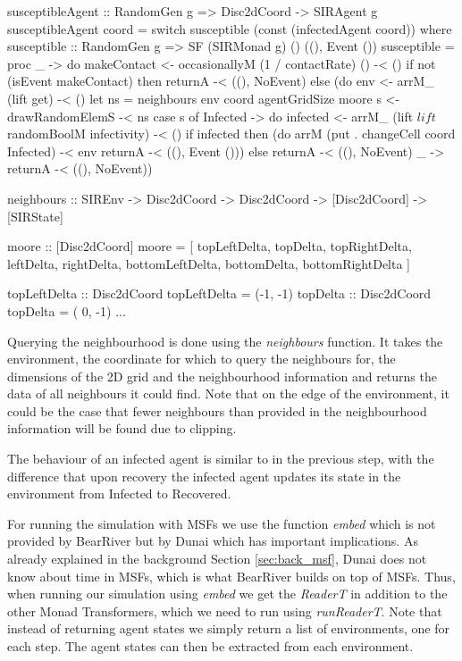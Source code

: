 \begin{HaskellCode}
susceptibleAgent :: RandomGen g => Disc2dCoord -> SIRAgent g
susceptibleAgent coord
    = switch susceptible (const (infectedAgent coord))
  where
    susceptible :: RandomGen g 
      => SF (SIRMonad g) () ((), Event ())
    susceptible = proc _ -> do
      makeContact <- occasionallyM (1 / contactRate) () -< ()
      if not (isEvent makeContact)
        then returnA -< ((), NoEvent)
        else (do
          env <- arrM_ (lift get) -< ()
          let ns = neighbours env coord agentGridSize moore
          s <- drawRandomElemS -< ns
          case s of
            Infected -> do
              infected <- arrM_ 
                (lift $ lift $ randomBoolM infectivity) -< ()
              if infected 
                then (do
                  arrM (put . changeCell coord Infected) -< env
                  returnA -< ((), Event ()))
                else returnA -< ((), NoEvent)
            _        -> returnA -< ((), NoEvent))

neighbours :: SIREnv -> Disc2dCoord -> Disc2dCoord 
           -> [Disc2dCoord] -> [SIRState]
           
moore :: [Disc2dCoord]
moore = [ topLeftDelta,    topDelta,     topRightDelta,
          leftDelta,                     rightDelta,
          bottomLeftDelta, bottomDelta,  bottomRightDelta ]

topLeftDelta :: Disc2dCoord
topLeftDelta      = (-1, -1)
topDelta :: Disc2dCoord
topDelta          = ( 0, -1)
...
\end{HaskellCode}
Querying the neighbourhood is done using the \textit{neighbours} function. It takes the environment, the coordinate for which to query the neighbours for, the dimensions of the 2D grid and the neighbourhood information and returns the data of all neighbours it could find. Note that on the edge of the environment, it could be the case that fewer neighbours than provided in the neighbourhood information will be found due to clipping.

The behaviour of an infected agent is similar to in the previous step, with the difference that upon recovery the infected agent updates its state in the environment from Infected to Recovered.

For running the simulation with MSFs we use the function \textit{embed} which is not provided by BearRiver but by Dunai which has important implications. As already explained in the background Section \ref{sec:back_msf}, Dunai does not know about time in MSFs, which is what BearRiver builds on top of MSFs. Thus, when running our simulation using \textit{embed} we get the \textit{ReaderT} in addition to the other Monad Transformers, which we need to run using \textit{runReaderT}. Note that instead of returning agent states we simply return a list of environments, one for each step. The agent states can then be extracted from each environment.

